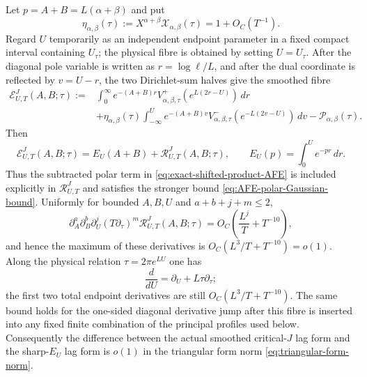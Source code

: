 \begin{lemma}
Let $p=A+B=L(\alpha+\beta)$ and put
\[
\eta_{\alpha,\beta}(\tau)
:=X^{\alpha+\beta}\mathcal X_{\alpha,\beta}(\tau)
=1+O_C(T^{-1}).
\]
Regard $U$ temporarily as an independent endpoint parameter in a fixed compact
interval containing $U_\tau$; the physical fibre is obtained by setting
$U=U_\tau$.  After the diagonal pole variable is written as
$r=\log\ell/L$, and after the dual coordinate is reflected by $v=U-r$, the
two Dirichlet-sum halves give the smoothed fibre
\begin{equation}
\boxed{
\begin{aligned}
\mathcal E^{J}_{U,T}(A,B;\tau):={}&
\int_0^\infty e^{-(A+B)r}
 V^+_{\alpha,\beta,\tau}\!\left(e^{L(2r-U)}\right)\,dr\\
&+\eta_{\alpha,\beta}(\tau)
 \int_{-\infty}^{U}e^{-(A+B)v}
 V^-_{\alpha,\beta,\tau}\!\left(e^{-L(2v-U)}\right)\,dv
-\mathcal P_{\alpha,\beta}(\tau).
\end{aligned}
}
\label{eq:J-AFE-actual-smooth-fibre}
\end{equation}
Then
\begin{equation}
\boxed{
\mathcal E^{J}_{U,T}(A,B;\tau)
=E_U(A+B)+\mathcal R^{J}_{U,T}(A,B;\tau),
\qquad
E_U(p)=\int_0^Ue^{-pr}\,dr.
}
\label{eq:J-AFE-sharp-transfer}
\end{equation}
Thus the subtracted polar term in
\eqref{eq:exact-shifted-product-AFE} is included explicitly in
$\mathcal R^{J}_{U,T}$ and satisfies the stronger bound
\eqref{eq:AFE-polar-Gaussian-bound}.  Uniformly for bounded $A,B,U$ and
$a+b+j+m\le2$,
\begin{equation}
\boxed{
\partial_A^a\partial_B^b\partial_U^j(T\partial_\tau)^m
\mathcal R^{J}_{U,T}(A,B;\tau)
=O_C\!\left(\frac{L^j}{T}+T^{-10}\right),
}
\label{eq:J-AFE-sharp-error}
\end{equation}
and hence the maximum of these derivatives is
$O_C(L^3/T+T^{-10})=o(1)$.  Along the physical relation
$\tau=2\pi e^{LU}$ one has
\[
\frac d{dU}=\partial_U+L\tau\partial_\tau;
\]
the first two total endpoint derivatives are still
$O_C(L^3/T+T^{-10})$.
The same bound holds for the one-sided diagonal derivative jump after this
fibre is inserted into any fixed finite combination of the principal profiles
used below.  Consequently the difference between the actual smoothed critical-$J$
lag form and the sharp-$E_U$ lag form is $o(1)$ in the triangular form norm
\eqref{eq:triangular-form-norm}.
\end{lemma}

